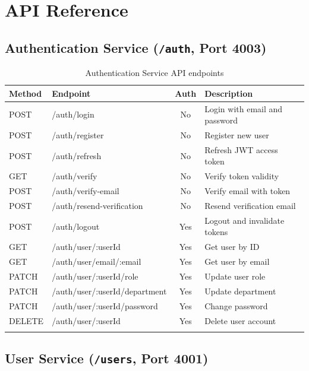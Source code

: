 \documentclass[a4paper,12pt]{report}
\begin{document}
\section{API Reference}

\subsection{Authentication Service (\texttt{/auth}, Port 4003)}

\begin{longtable}{llcp{5.5cm}}
    \toprule
    \textbf{Method} & \textbf{Endpoint} & \textbf{Auth} & \textbf{Description} \\
    \midrule
    \endhead
    POST & /auth/login & No & Login with email and password \\
    POST & /auth/register & No & Register new user \\
    POST & /auth/refresh & No & Refresh JWT access token \\
    GET & /auth/verify & No & Verify token validity \\
    POST & /auth/verify-email & No & Verify email with token \\
    POST & /auth/resend-verification & No & Resend verification email \\
    POST & /auth/logout & Yes & Logout and invalidate tokens \\
    GET & /auth/user/:userId & Yes & Get user by ID \\
    GET & /auth/user/email/:email & Yes & Get user by email \\
    PATCH & /auth/user/:userId/role & Yes & Update user role \\
    PATCH & /auth/user/:userId/department & Yes & Update department \\
    PATCH & /auth/user/:userId/password & Yes & Change password \\
    DELETE & /auth/user/:userId & Yes & Delete user account \\
    \bottomrule
\caption{Authentication Service API endpoints}
\end{longtable}

\subsection{User Service (\texttt{/users}, Port 4001)}
\end{document}
